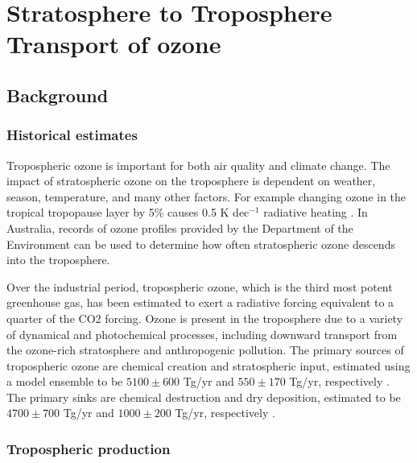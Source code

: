 
\chapter{Stratosphere to Troposphere Transport of ozone} %
\label{ch_o3}

\section{Background}
  \label{ch_o3:sec:ozone}

  \subsection{Historical estimates}
    Tropospheric ozone is important for both air quality and climate change. 
    The impact of stratospheric ozone on the troposphere is dependent on weather, season, temperature, and many other factors. 
    For example changing ozone in the tropical tropopause layer by 5\% causes 0.5 K dec$^{-1}$ radiative heating \citep{Forster2007}.
    In Australia, records of ozone profiles provided by the Department of the Environment can be used to determine how often stratospheric ozone descends into the troposphere.
    

    Over the industrial period, tropospheric ozone, which is the third most potent greenhouse gas, has been estimated to exert a radiative forcing equivalent to a quarter of the CO2 forcing. 
    Ozone is present in the troposphere due to a variety of dynamical and photochemical processes, including downward  transport from the ozone-rich stratosphere and anthropogenic pollution.
    The primary sources of tropospheric ozone are chemical creation and stratospheric input, estimated using a model ensemble to be $5100\pm600$ Tg/yr and $550\pm170$ Tg/yr, respectively \citep{Stevenson2006}.
    The primary sinks are chemical destruction and dry deposition, estimated to be $4700\pm700$ Tg/yr and $1000\pm200$ Tg/yr, respectively \citep{Stevenson2006}.

  \subsection{Tropospheric production}
  
